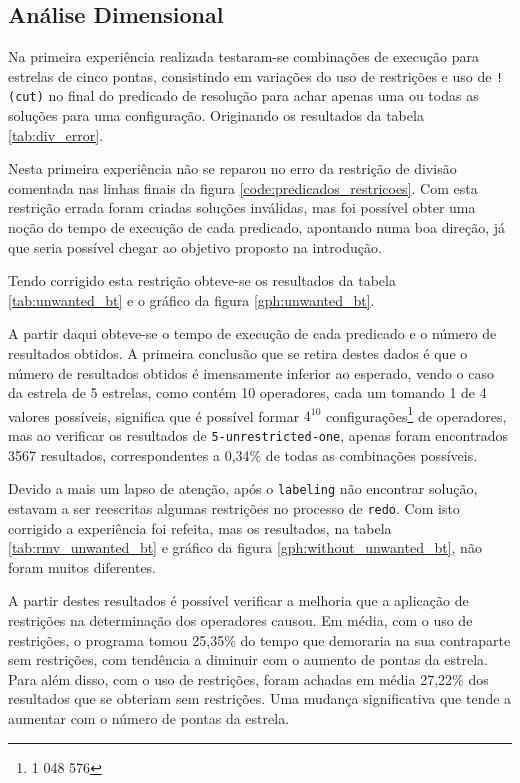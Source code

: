 \subsection{Análise Dimensional}

Na primeira experiência realizada testaram-se combinações de execução para estrelas de cinco pontas, consistindo em variações do uso de restrições e uso de \verb|! (cut)| no final do predicado de resolução para achar apenas uma ou todas as soluções para uma configuração. Originando os resultados da tabela \ref{tab:div_error}.



Nesta primeira experiência não se reparou no erro da restrição de divisão comentada nas linhas finais da figura \ref{code:predicados_restricoes}. Com esta restrição errada foram criadas soluções inválidas, mas foi possível obter uma noção do tempo de execução de cada predicado, apontando numa boa direção, já que seria possível chegar ao objetivo proposto na introdução.

Tendo corrigido esta restrição obteve-se os resultados da tabela \ref{tab:unwanted_bt} e o gráfico da figura \ref{gph:unwanted_bt}.



A partir daqui obteve-se o tempo de execução de cada predicado e o número de resultados obtidos. A primeira conclusão que se retira destes dados é que o número de resultados obtidos é imensamente inferior ao esperado, vendo o caso da estrela de 5 estrelas, como contém 10 operadores, cada um tomando 1 de 4 valores possíveis, significa que é possível formar \(4^{10}\) configurações\footnote{1 048 576} de operadores, mas ao verificar os resultados de \verb|5-unrestricted-one|, apenas foram encontrados 3567 resultados, correspondentes a 0,34\% de todas as combinações possíveis. 

Devido a mais um lapso de atenção, após o \verb|labeling| não encontrar solução, estavam a ser reescritas algumas restrições no processo de \verb|redo|. Com isto corrigido a experiência foi refeita, mas os resultados, na tabela \ref{tab:rmv_unwanted_bt} e gráfico da figura \ref{gph:without_unwanted_bt}, não foram muitos diferentes.

A partir destes resultados é possível verificar a melhoria que a aplicação de restrições na determinação dos operadores causou. Em média, com o uso de restrições, o programa tomou 25,35\% do tempo que demoraria na sua contraparte sem restrições, com tendência a diminuir com o aumento de pontas da estrela. Para além disso, com o uso de restrições, foram achadas em média 27,22\% dos resultados que se obteriam sem restrições. Uma mudança significativa que tende a aumentar com o número de pontas da estrela.

